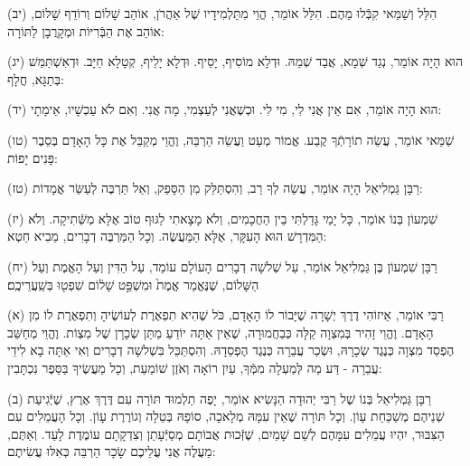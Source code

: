 \documentclass[twoside, openany, parskip=half, 11pt]{book}
\begin{document}
(יב) הִלֵּל וְשַׁמַּאי קִבְּֿלוּ מֵהֶם. הִלֵּל אוֹמֵר, הֱוֵי מִתַּלְמִידָיו שֶׁל אַהֲרֹן, אוֹהֵב שָׁלוֹם וְרוֹדֵף שָׁלוֹם, אוֹהֵב אֶת הַבְּֿרִיּוֹת וּמְקָרֲבָן לַתּוֹרָה:

(יג) הוּא הָיָה אוֹמֵר, נְגַד שְׁמָא, אֲבַד שְׁמֵהּ. וּדְלָא מוֹסִיף, יָסֵיף. וּדְלָא יָלֵיף, קְטָלָא חַיָּב. וּדְאִשְׁתַּמֵּשׁ בְּתַגָּא, חֳלָף:

(יד) הוּא הָיָה אוֹמֵר, אִם אֵין אֲנִי לִי, מִי לִי. וּכְשֶׁאֲנִי לְעַצְמִי, מָה אֲנִי. וְאִם לֹא עַכְשָׁיו, אֵימָתָי:

(טו) שַׁמַּאי אוֹמֵר, עֲשֵׂה תוֹרָתְֿךָ קֶבַע. אֱמוֹר מְעַט וַעֲשֵׂה הַרְבֵּה, וֶהֱוֵי מְקַבֵּל אֶת כָּל הָאָדָם בְּסֵבֶר פָּנִים יָפוֹת:

(טז) רַבָּן גַּמְלִיאֵל הָיָה אוֹמֵר, עֲשֵׂה לְךָ רַב, וְהִסְתַּלֵּק מִן הַסָּפֵק, וְאַל תַּרְבֶּה לְעַשֵּׂר אֳמָדוֹת:

(יז) שִׁמְעוֹן בְּנוֹ אוֹמֵר, כָּל יָמַי גָּדַלְתִּי בֵין הַחֲכָמִים, וְלֹא מָצָאתִי לַגּוּף טוֹב אֶלָּא מְשְּֿׁתִיקָה. וְלֹא הַמִּדְרָשׁ הוּא הָעִקָּר, אֶלָּא הַמַּעֲשֶׂה. וְכָל
הַמַּרְבֶּה דְבָרִים, מֵבִיא חֵטְא:



(יח) רַבָּן שִׁמְעוֹן בֶּן גַּמְלִיאֵל אוֹמֵר, עַל שְׁלשָׁה דְבָרִים הָעוֹלָם עוֹמֵד, עַל הַדִּין וְעַל הָאֱמֶת וְעַל הַשָּׁלוֹם, שֶׁנֶּאֱמַר 
 אֱמֶת֙ וּמִשְׁפַּ֣ט שָׁל֔וֹם שִׁפְט֖וּ בְּשַֽׁעֲרֵיכֶֽם׃





\kolyisroel

(א) רַבִּי אוֹמֵר, אֵיזוֹהִי דֶרֶךְ יְשָׁרָה שֶׁיָּבוֹר לוֹ הָאָדָם, כֹּל שֶׁהִיא תִפְאֶרֶת לְעוֹשֶׂיהָ וְתִפְאֶרֶת לוֹ מִן הָאָדָם.
וֶהֱוֵי זָהִיר בְּמִצְוָה קַלָּה כְּבַחֲמוּרָה, שֶׁאֵין אַתָּה יוֹדֵעַ מַתַּן שְׂכָרָן שֶׁל מִצְוֹת. וֶהֱוֵי מְחַשֵּׁב הֶפְסֵד מִצְוָה כְּנֶגֶד שְׂכָרָהּ, וּשְׂכַר עֲבֵרָה כְּנֶגֶד הֶפְסֵדָהּ.
וְהִסְתַּכֵּל בִּשְׁלשָׁה דְבָרִים וְאִי אַתָּה בָא לִידֵי עֲבֵרָה - דַּע מַה לְּמַעְלָה מִמְּֿךָ, עַיִן רוֹאָה וְאֹזֶן שׁוֹמַעַת, וְכָל מַעֲשֶׂיךָ בַּסֵּפֶר נִכְתָּבִין:

(ב) רַבָּן גַּמְלִיאֵל בְּנוֹ שֶׁל רַבִּי יְהוּדָה הַנָּשִׂיא אוֹמֵר, יָפֶה תַלְמוּד תּוֹרָה עִם דֶּרֶךְ אֶרֶץ, שֶׁיְּֿגִיעַת שְׁנֵיהֶם מְשַׁכַּחַת עָוֹן.
וְכָל תּוֹרָה שֶׁאֵין עִמָּהּ מְלָאכָה, סוֹפָהּ בְּטֵלָה וְגוֹרֶרֶת עָוֹן. וְכָל הָעֲמֵלִים עִם הַצִּבּוּר, יִהְיוּ עֲמֵלִים עִמָּהֶם לְשֵׁם שָׁמַיִם, שֶׁזְּֿכוּת אֲבוֹתָם מְסַיְּֿעָתַן וְצִדְקָתָם עוֹמֶדֶת לָעַד. וְאַתֶּם, מַעֲלֶה אֲנִי עֲלֵיכֶם שָׂכָר הַרְבֵּה כְּאִלּוּ עֲשִׂיתֶם:
\end{document}
